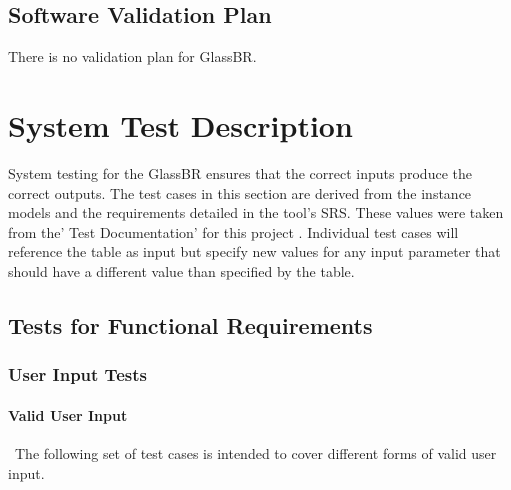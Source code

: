 \documentclass[12pt, titlepage]{article}
\newcommand{\progname}{GlassBR}
\begin{document}
\subsection{Software Validation Plan}

There is no validation plan for \progname{}.  

\section{System Test Description} \label{sec_System}

System testing for the \progname{} ensures that the correct inputs produce
the correct outputs. The test cases in this section are derived from the
instance models and the requirements detailed in the tool’s SRS. These values were 
taken from the' Test Documentation'  for this project . Individual 
test cases will reference the table as input but specify new values for any 
input parameter that should have a different value than specified by the table.

\subsection{Tests for Functional Requirements}

\subsubsection{User Input Tests}

\paragraph{Valid User Input}

~\newline \noindent The following set of test cases is intended to cover 
different forms of valid user input.  
\end{document}
